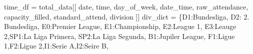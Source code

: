 \documentclass[
  letterpaper,
  DIV=11,
  numbers=noendperiod]{scrartcl}
\newenvironment{Shaded}{\begin{snugshade}}{\end{snugshade}}
\newcommand{\NormalTok}[1]{\textcolor[rgb]{0.00,0.23,0.31}{#1}}
\newcommand{\OperatorTok}[1]{\textcolor[rgb]{0.37,0.37,0.37}{#1}}
\newcommand{\StringTok}[1]{\textcolor[rgb]{0.13,0.47,0.30}{#1}}
\begin{document}
\begin{Shaded}
\begin{Highlighting}[]
\NormalTok{time\_df }\OperatorTok{=}\NormalTok{ total\_data[[}
    \StringTok{\textquotesingle{}date\textquotesingle{}}\NormalTok{, }\StringTok{\textquotesingle{}time\textquotesingle{}}\NormalTok{, }\StringTok{\textquotesingle{}day\_of\_week\textquotesingle{}}\NormalTok{, }\StringTok{\textquotesingle{}date\_time\textquotesingle{}}\NormalTok{, }\StringTok{\textquotesingle{}raw\_attendance\textquotesingle{}}\NormalTok{, }\StringTok{\textquotesingle{}capacity\_filled\textquotesingle{}}\NormalTok{, }\StringTok{\textquotesingle{}standard\_attend\textquotesingle{}}\NormalTok{, }\StringTok{\textquotesingle{}division\textquotesingle{}}
\NormalTok{]]}
\NormalTok{div\_dict }\OperatorTok{=}\NormalTok{ \{}\StringTok{\textquotesingle{}D1\textquotesingle{}}\NormalTok{:}\StringTok{\textquotesingle{}Bundesliga\textquotesingle{}}\NormalTok{, }\StringTok{\textquotesingle{}D2\textquotesingle{}}\NormalTok{: }\StringTok{\textquotesingle{}2. Bundesliga\textquotesingle{}}\NormalTok{, }\StringTok{\textquotesingle{}E0\textquotesingle{}}\NormalTok{:}\StringTok{\textquotesingle{}Premier League\textquotesingle{}}\NormalTok{, }\StringTok{\textquotesingle{}E1\textquotesingle{}}\NormalTok{:}\StringTok{\textquotesingle{}Championship\textquotesingle{}}\NormalTok{, }
            \StringTok{\textquotesingle{}E2\textquotesingle{}}\NormalTok{:}\StringTok{\textquotesingle{}League 1\textquotesingle{}}\NormalTok{, }\StringTok{\textquotesingle{}E3\textquotesingle{}}\NormalTok{:}\StringTok{\textquotesingle{}Leauge 2\textquotesingle{}}\NormalTok{,}\StringTok{\textquotesingle{}SP1\textquotesingle{}}\NormalTok{:}\StringTok{\textquotesingle{}La Liga Primera\textquotesingle{}}\NormalTok{, }\StringTok{\textquotesingle{}SP2\textquotesingle{}}\NormalTok{:}\StringTok{\textquotesingle{}La Liga Segunda\textquotesingle{}}\NormalTok{,}
              \StringTok{\textquotesingle{}B1\textquotesingle{}}\NormalTok{:}\StringTok{\textquotesingle{}Jupiler League\textquotesingle{}}\NormalTok{, }\StringTok{\textquotesingle{}F1\textquotesingle{}}\NormalTok{:}\StringTok{\textquotesingle{}Ligue 1\textquotesingle{}}\NormalTok{,}\StringTok{\textquotesingle{}F2\textquotesingle{}}\NormalTok{:}\StringTok{\textquotesingle{}Ligue 2\textquotesingle{}}\NormalTok{,}\StringTok{\textquotesingle{}I1\textquotesingle{}}\NormalTok{:}\StringTok{\textquotesingle{}Serie A\textquotesingle{}}\NormalTok{,}\StringTok{\textquotesingle{}I2\textquotesingle{}}\NormalTok{:}\StringTok{\textquotesingle{}Seire B\textquotesingle{}}\NormalTok{, }

\end{Highlighting}
\end{Shaded}
\end{document}
